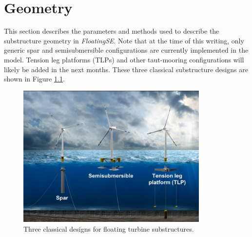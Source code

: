 \chapter{Geometry}
\label{sec:geom}
This section describes the parameters and methods used to describe the
substructure geometry in \textit{FloatingSE}.  Note that at the time of this
writing, only generic spar and semisubmersible configurations are
currently implemented in the model.  Tension leg platforms (TLPs) and
other taut-mooring configurations will likely be added in the next
months.  These three classical substructure designs are shown in Figure
\ref{fig:archetype}.
\begin{figure}
  \begin{center}
    \includegraphics[width=3.75in]{figs/archetypes}
    \caption{Three classical designs for floating turbine substructures.}
    \label{fig:archetype}
  \end{center}
\end{figure}

